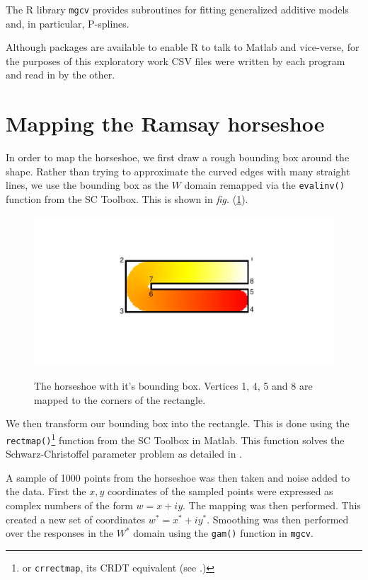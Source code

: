 \documentclass[a4paper,10pt]{amsart}
\newcommand{\sch}{Schwarz-Christoffel }
\newcommand{\fig}[1]{\emph{fig.} (\ref{#1})}
\begin{document}
The \textsf{R} library \texttt{mgcv} provides subroutines for fitting generalized additive models and, in particular, P-splines.

Although packages are available to enable \textsf{R} to talk to Matlab and vice-verse, for the purposes of this exploratory work CSV files were written by each program and read in by the other.

\section{Mapping the Ramsay horseshoe}

In order to map the horseshoe, we first draw a rough bounding box around the shape. Rather than trying to approximate the curved edges with many straight lines, we use the bounding box as the $W$ domain remapped via the \texttt{evalinv()} function from the SC Toolbox. This is shown in \fig{hswithboundingbox}.

\begin{figure}
\centering
\includegraphics[trim=0.5in 1in 0in 1in]{figs/hswithboundingbox.pdf} \\
\caption{The horseshoe with it's bounding box. Vertices 1, 4, 5 and 8 are mapped to the corners of the rectangle.}
\label{hswithboundingbox}
\end{figure}

We then transform our bounding box into the rectangle. This is done using the \texttt{rectmap()}\footnote{or \texttt{crrectmap}, its CRDT equivalent (see \cite{miller08}.)} function from the SC Toolbox in Matlab. This function solves the \sch parameter problem as detailed in \cite{miller08}.

A sample of 1000 points from the horseshoe was then taken and noise added to the data. First the $x,y$ coordinates of the sampled points were expressed as complex numbers of the form $w=x+iy$. The mapping was then performed. This created a new set of coordinates $w^*=x^*+iy^*$. Smoothing was then performed over the responses in the $W^*$ domain using the \texttt{gam()} function in \texttt{mgcv}. 
\end{document}
